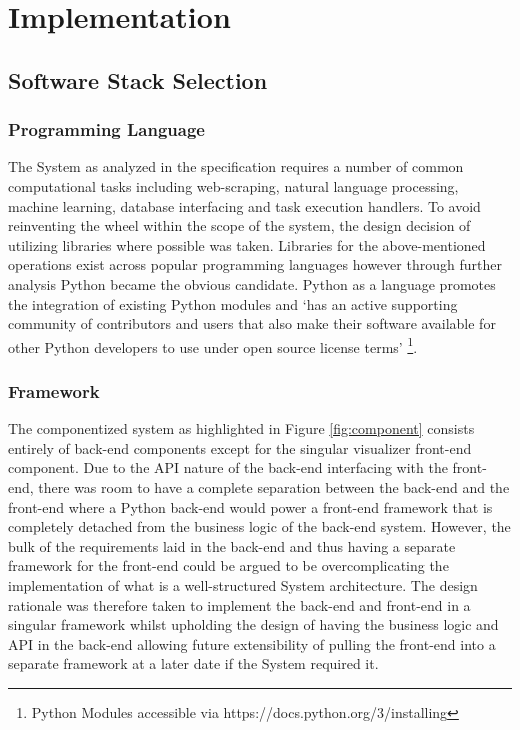 \documentclass[11pt]{report}
\begin{document}
\chapter{Implementation}
\section{Software Stack Selection}

\subsection{Programming Language}
The System as analyzed in the specification requires a number of common computational tasks including web-scraping, natural language processing, machine learning, database interfacing and task execution handlers. To avoid reinventing the wheel within the scope of the system, the design decision of utilizing libraries where possible was taken. Libraries for the above-mentioned operations exist across popular programming languages however through further analysis Python became the obvious candidate. Python as a language promotes the integration of existing Python modules and `has an active supporting community of contributors and users that also make their software available for other Python developers to use under open source license terms'  \footnote{Python Modules accessible via https://docs.python.org/3/installing}.

\subsection{Framework}
The componentized system as highlighted in Figure \ref{fig:component} consists entirely of back-end components except for the singular visualizer front-end component. Due to the API nature of the back-end interfacing with the front-end, there was room to have a complete separation between the back-end and the front-end where a Python back-end would power a front-end framework that is completely detached from the business logic of the back-end system. However, the bulk of the requirements laid in the back-end and thus having a separate framework for the front-end could be argued to be overcomplicating the implementation of what is a well-structured System architecture. The design rationale was therefore taken to implement the back-end and front-end in a singular framework whilst upholding the design of having the business logic and API in the back-end allowing future extensibility of pulling the front-end into a separate framework at a later date if the System required it.
\\
\end{document}

